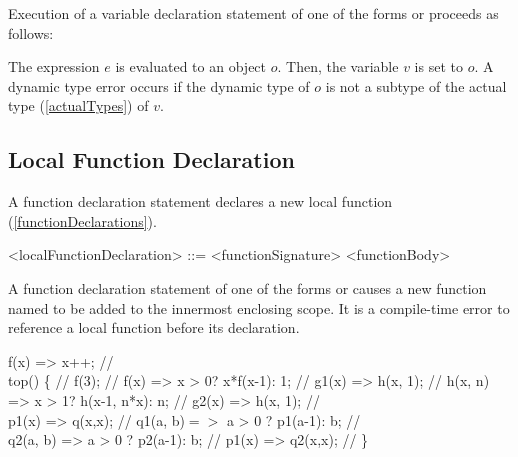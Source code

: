 \documentclass[makeidx]{article}
\begin{document}
{

\LMHash{}%
Execution of a variable declaration statement of one of the forms
 or
proceeds as follows:

\LMHash{}%
The expression $e$ is evaluated to an object $o$.
Then, the variable $v$ is set to $o$.
A dynamic type error occurs
if the dynamic type of $o$ is not a subtype of the actual type
(\ref{actualTypes})
of $v$.



\subsection{Local Function Declaration}

\LMHash{}%
A function declaration statement declares a new local function (\ref{functionDeclarations}).

\begin{grammar}
<localFunctionDeclaration> ::= <functionSignature> <functionBody>
\end{grammar}

\LMHash{}%
A function declaration statement of one of the forms
or
causes a new function named \id{} to be added to the innermost enclosing scope.
It is a compile-time error to reference a local function before its declaration.


\begin{dartCode}
f(x) => x++; // 
\\
top() \{ // 
  f(3); // 
  f(x) => x > 0? x*f(x-1): 1; // 
  g1(x) => h(x, 1); // 
  h(x, n) => x > 1? h(x-1, n*x): n; // 
  g2(x) => h(x, 1); // 
\\
  p1(x) => q(x,x); // 
  q1(a, b)$ =>$ a > 0 ? p1(a-1): b; // 
\\
  q2(a, b) => a > 0 ? p2(a-1): b; // 
  p1(x) => q2(x,x); // 
\}
\end{dartCode}

}
\end{document}
